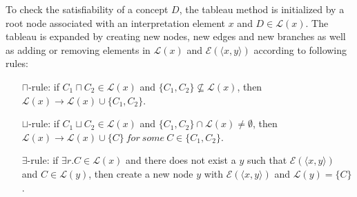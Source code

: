 \documentclass{article}
\begin{document}
To check the satisfiability of a concept $D$, the tableau method is initialized by a root node associated with an interpretation element $x$ and $D\in \mathcal{L}(x)$. 
The tableau is expanded by creating new nodes, new edges and new branches as well as adding or removing elements
in $\mathcal{L}(x)$ and  $\mathcal{E}(\langle x,y\rangle)$ according to following rules:
\begin{itemize}
\item[$\sqcap$-rule:] if $C_1\sqcap C_2\in \mathcal{L}(x)$ and $\{C_1,C_2\}\nsubseteq \mathcal{L}(x)$, then $ \mathcal{L}(x)\rightarrow  \mathcal{L}(x)\cup \{C_1,C_2\}$.
\begin{center}
\end{center}
\item[$\sqcup$-rule:] if $C_1\sqcup C_2\in \mathcal{L}(x)$ and $\{C_1,C_2\} \cap \mathcal{L}(x)\neq \emptyset$, then $ \mathcal{L}(x)\rightarrow 
\mathcal{L}(x)\cup \{C\}~for ~some ~C\in\{C_1,C_2\}$.
\begin{center}
\end{center}
\item[$\exists$-rule:]  if $\exists r.C\in \mathcal{L}(x)$ and there does not exist a $y$ such that $\mathcal{E}(\langle x,y \rangle)$ and $C\in \mathcal{L}(y)$, then create a new node $y$ 
with $\mathcal{E}(\langle x,y\rangle)$ and $\mathcal{L}(y)=\{C\}$.
\begin{center}
\end{center}
\end{itemize}
\end{document}

